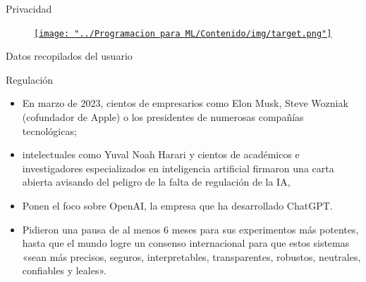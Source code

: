 \documentclass[11pt,aspectratio=169]{beamer}
\begin{document}
\begin{frame}{Privacidad}
    \begin{figure}
        \centering
        \href{https://www.businessinsider.com/the-incredible-story-of-how-target-exposed-a-teen-girls-pregnancy-2012-2?r=MX&IR=T}{\texttt{[image: "../Programacion para ML/Contenido/img/target.png"]}}
    \end{figure}
\end{frame}

\begin{frame}{Datos recopilados del usuario}
    
\end{frame}

\begin{frame}{Regulación}
    \begin{itemize}
        \item En marzo de 2023, cientos de empresarios como Elon Musk, Steve Wozniak 
            (cofundador de Apple) o los presidentes de numerosas compañías tecnológicas; 
        \item intelectuales como Yuval Noah Harari y cientos de académicos e investigadores 
            especializados en inteligencia artificial firmaron una carta abierta avisando 
            del peligro de la falta de regulación de la IA, 
        \item Ponen el foco sobre OpenAI, la empresa que ha desarrollado ChatGPT. 
        \item Pidieron una pausa de al menos 6 meses para sus experimentos más potentes, 
            hasta que el mundo logre un consenso internacional para que estos sistemas 
            «sean más precisos, seguros, interpretables, transparentes, robustos, neutrales, 
            confiables y leales».
    \end{itemize}
\end{frame}
\end{document}
